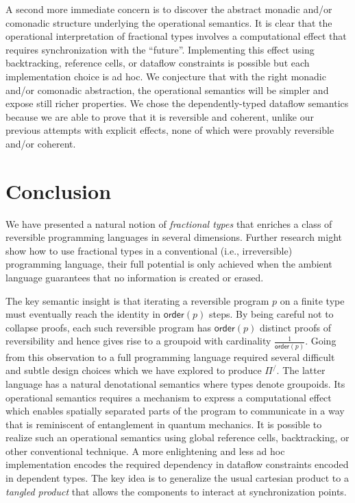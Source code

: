 \documentclass[a4paper,USenglish]{lipics-v2016-utf8x}
\newcommand{\ord}[1]{\ensuremath{\mathsf{order}(#1)}}
\begin{document}
A second more immediate concern is to discover the abstract monadic and/or
comonadic structure underlying the operational semantics. It is clear that the
operational interpretation of fractional types involves a computational effect
that requires synchronization with the ``future''. Implementing this effect
using backtracking, reference cells, or dataflow constraints is possible but
each implementation choice is ad hoc. We conjecture that with the right monadic
and/or comonadic abstraction, the operational semantics will be simpler and
expose still richer properties.  We chose the dependently-typed dataflow
semantics because we are able to prove that it is reversible and coherent,
unlike our previous attempts with explicit effects, none of which were provably
reversible and/or coherent.

\section{Conclusion}

We have presented a natural notion of \emph{fractional types} that
enriches a class of reversible programming languages in several
dimensions.  Further research might show how to use fractional
types in a conventional (i.e., irreversible) programming language, their full
potential is only achieved when the ambient language guarantees that
no information is created or erased.

The key semantic insight is that iterating a reversible program $p$ on
a finite type must eventually reach the identity in $\ord{p}$
steps. By being careful not to collapse proofs, each such reversible
program has $\ord{p}$ distinct proofs of reversibility and hence gives
rise to a groupoid with cardinality $\frac{1}{\ord{p}}$. Going from
this observation to a full programming language required several
difficult and subtle design choices which we have explored to produce
$\Pi^/$. The latter language has a natural denotational semantics
where types denote groupoids. Its operational semantics requires a
mechanism to express a computational effect which enables spatially
separated parts of the program to communicate in a way that is
reminiscent of entanglement in quantum mechanics. It is possible to
realize such an operational semantics using global reference cells,
backtracking, or other conventional technique. A more enlightening and
less ad hoc implementation encodes the required dependency in dataflow
constraints encoded in dependent types. The key idea is to generalize
the usual cartesian product to a \emph{tangled product} that allows the
components to interact at synchronization points.
\end{document}
